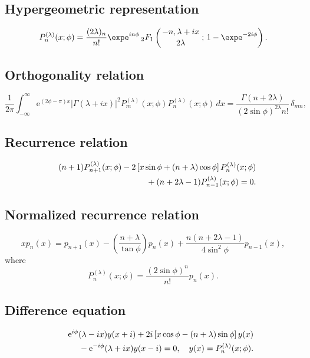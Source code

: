 \documentclass[envcountchap,graybox]{svmono}
\newcommand{\hyp}[5]{\mbox{}_{#1}{F}_{#2}
\left(\genfrac{}{}{0pt}{}{#3}{#4}\,;\,#5\right)}
\newcommand{\mathindent}{\hspace{7.5mm}}
\newcommand{\e}{\textrm{e}}
\renewcommand{\Gamma}{\varGamma}
\begin{document}
\subsection*{Hypergeometric representation}
\begin{equation}
\label{DefMP}
P_n^{(\lambda)}(x;\phi)=\frac{(2\lambda)_n}{n!}\expe^{in\phi}\,
\hyp{2}{1}{-n,\lambda+ix}{2\lambda}{1-\expe^{-2i\phi}}.
\end{equation}

\subsection*{Orthogonality relation}
\begin{equation}
\label{OrtMP}
\frac{1}{2\pi}\int_{-\infty}^{\infty}
\e^{(2\phi-\pi)x}\left|\Gamma(\lambda+ix)\right|^2
P_m^{(\lambda)}(x;\phi)P_n^{(\lambda)}(x;\phi)\,dx
{}=\frac{\Gamma(n+2\lambda)}{(2\sin\phi)^{2\lambda}n!}\,\delta_{mn},
\end{equation}

\subsection*{Recurrence relation}
\begin{eqnarray}
\label{RecMP}
& &(n+1)P_{n+1}^{(\lambda)}(x;\phi)-2\left[x\sin\phi+(n+\lambda)\cos\phi\right]
P_n^{(\lambda)}(x;\phi)\nonumber\\
& &{}\mathindent{}+(n+2\lambda-1)P_{n-1}^{(\lambda)}(x;\phi)=0.
\end{eqnarray}

\subsection*{Normalized recurrence relation}
\begin{equation}
\label{NormRecMP}
xp_n(x)=p_{n+1}(x)-\left(\frac{n+\lambda}{\tan\phi}\right)p_n(x)+
\frac{n(n+2\lambda-1)}{4\sin^2\phi}p_{n-1}(x),
\end{equation}
where
$$P_n^{(\lambda)}(x;\phi)=\frac{(2\sin\phi)^n}{n!}p_n(x).$$

\subsection*{Difference equation}
\begin{eqnarray}
\label{dvMP}
& &\e^{i\phi}(\lambda-ix)y(x+i)+2i\left[x\cos\phi-(n+\lambda)\sin\phi\right]y(x)\nonumber\\
& &{}\mathindent{}-\e^{-i\phi}(\lambda+ix)y(x-i)=0,\quad y(x)=P_n^{(\lambda)}(x;\phi).
\end{eqnarray}
\end{document}
